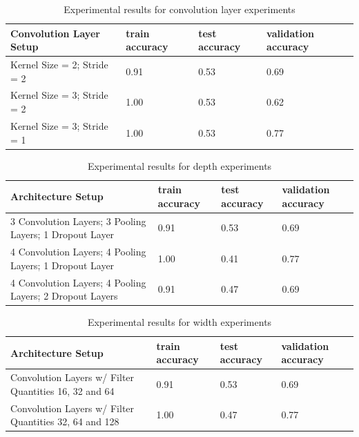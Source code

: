 \documentclass{article}
\begin{document}
\begin{table}[]
    \centering    
    \caption{Experimental results for convolution layer experiments}
    \label{table:convolution}
    \begin{tabular}{llll}
        \toprule
        \centering
        {Convolution Layer Setup} & train accuracy & test accuracy & validation accuracy \\
        \midrule
         Kernel Size = 2; Stride = 2 & 0.91  & 0.53 & 0.69 \\
         Kernel Size = 3; Stride = 2 & 1.00 & 0.53 & 0.62  \\
         Kernel Size = 3; Stride = 1 & 1.00 & 0.53 & 0.77  \\
        \bottomrule
    \end{tabular}
\end{table}

\begin{table}[ht!]
    \centering    
    \caption{Experimental results for depth experiments}
    \label{table:depth}
    \begin{tabular}{llll}
        \toprule
        \centering
        {Architecture Setup} & train accuracy & test accuracy & validation accuracy \\
        \midrule
         3 Convolution Layers; 3 Pooling Layers; 1 Dropout Layer & 0.91  & 0.53 & 0.69 \\
         4 Convolution Layers; 4 Pooling Layers; 1 Dropout Layer & 1.00 & 0.41 & 0.77  \\
         4 Convolution Layers; 4 Pooling Layers; 2 Dropout Layers & 0.91 & 0.47 & 0.69  \\
        \bottomrule
    \end{tabular}
\end{table}

\begin{table}[ht!]
    \centering    
    \caption{Experimental results for width experiments}
    \label{table:width}
    \begin{tabular}{llll}
        \toprule
        \centering
        {Architecture Setup} & train accuracy & test accuracy & validation accuracy \\
        \midrule
         Convolution Layers w/ Filter Quantities 16, 32 and 64 & 0.91 & 0.53 & 0.69 \\
         Convolution Layers w/ Filter Quantities 32, 64 and 128 & 1.00 & 0.47 & 0.77 \\
        \bottomrule
    \end{tabular}
\end{table}
\end{document}
